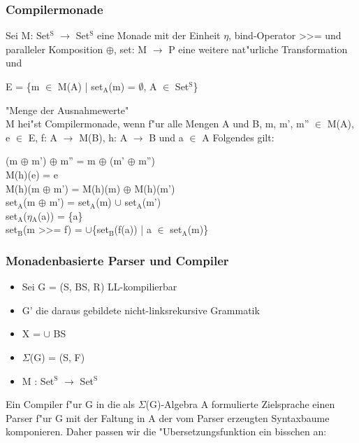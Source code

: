 \documentclass[11pt]{article}
\begin{document}
\subsubsection{Compilermonade}
\label{sec-5-2-5}
Sei M: Set$^{\text{S}}$ $\to$ Set$^{\text{S}}$ eine Monade mit der Einheit $\eta$, bind-Operator >>= und paralleler Komposition $\oplus$, set: M $\to$ P eine 
weitere nat"urliche Transformation und 
\begin{center}
E = \{m $\in$ M(A) | set$_{\text{A}}$(m) = $\emptyset$, A $\in$ Set$^{\text{S}}$\}
\end{center}
"Menge der Ausnahmewerte" \\

M hei"st Compilermonade, wenn f"ur alle Mengen A und B, m, m', m'' $\in$ M(A), e $\in$ E, f: A $\to$ M(B), h: A $\to$ B und a $\in$ A Folgendes gilt:
\begin{center}
(m $\oplus$ m') $\oplus$ m'' = m $\oplus$ (m' $\oplus$ m'') \\
M(h)(e) = e \\
M(h)(m $\oplus$ m') = M(h)(m) $\oplus$ M(h)(m') \\
set$_{\text{A}}$(m $\oplus$ m') = set$_{\text{A}}$(m) $\cup$ set$_{\text{A}}$(m') \\
set$_{\text{A}}$($\eta$$_{\text{A}}$(a)) = \{a\} \\
set$_{\text{B}}$(m >>= f) = $\cup$\{set$_{\text{B}}$(f(a)) | a $\in$ set$_{\text{A}}$(m)\}
\end{center}

\subsubsection{Monadenbasierte Parser und Compiler}
\label{sec-5-2-6}

\begin{itemize}
\item Sei G = (S, BS, R) LL-kompilierbar
\item G' die daraus gebildete nicht-linksrekursive Grammatik
\item X = $\cup$ BS
\item $\Sigma$(G) = (S, F)
\item M : Set$^{\text{S}}$ $\to$ Set$^{\text{S}}$
\end{itemize}

Ein Compiler f"ur G in die als $\Sigma$(G)-Algebra A formulierte Zielsprache einen Parser f"ur G mit der Faltung in A der vom Parser 
erzeugten Syntaxbaume komponieren.
Daher passen wir die "Ubersetzungsfunktion ein bisschen an:
\end{document}
